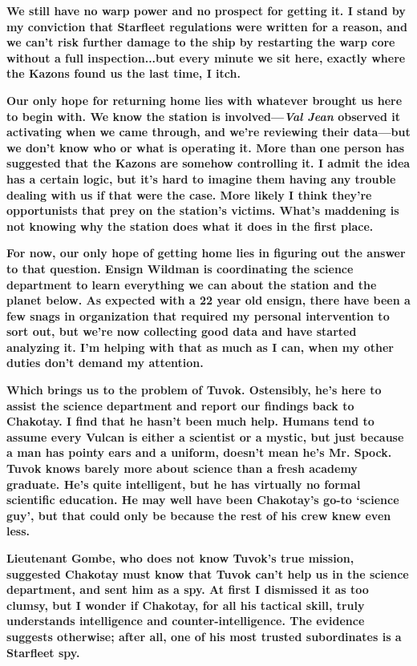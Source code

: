 \documentclass[twoside,letterpaper,12pt]{memoir}
\begin{document}
\textbf{We still have no warp power and no prospect for getting it. I stand by my conviction that Starfleet regulations were written for a reason, and we can't risk further damage to the ship by restarting the warp core without a full inspection...but every minute we sit here, exactly where the Kazons found us the last time, I itch.}

\textbf{Our only hope for returning home lies with whatever brought us here to begin with. We know the station is involved---\textit{Val Jean }observed it activating when we came through, and we’re reviewing their data---but we don’t know who or what is operating it. More than one person has suggested that the Kazons are somehow controlling it. I admit the idea has a certain logic, but it’s hard to imagine them having any trouble dealing with us if that were the case. More likely I think they’re opportunists that prey on the station’s victims. What’s maddening is not knowing why the station does what it does in the first place.}

\textbf{For now, our only hope of getting home lies in figuring out the answer to that question. Ensign Wildman is coordinating the science department to learn everything we can about the station and the planet below. As expected with a 22 year old ensign, there have been a few snags in organization that required my personal intervention to sort out, but we're now collecting good data and have started analyzing it. I'm helping with that as much as I can, when my other duties don't demand my attention.}

\textbf{Which brings us to the problem of Tuvok. Ostensibly, he's here to assist the science department and report our findings back to Chakotay. I find that he hasn't been much help. Humans tend to assume every Vulcan is either a scientist or a mystic, but just because a man has pointy ears and a uniform, doesn't mean he's Mr. Spock. Tuvok knows barely more about science than a fresh academy graduate. He’s quite intelligent, but he has virtually no formal scientific education. He may well have been Chakotay's go-to `science guy', but that could only be because the rest of his crew knew even less. }

\textbf{Lieutenant Gombe, who does not know Tuvok's true mission, suggested Chakotay must know that Tuvok can't help us in the science department, and sent him as a spy. At first I dismissed it as too clumsy, but I wonder if Chakotay, for all his tactical skill, truly understands intelligence and counter-intelligence. The evidence suggests otherwise; after all, one of his most trusted subordinates is a Starfleet spy.}
\end{document}
